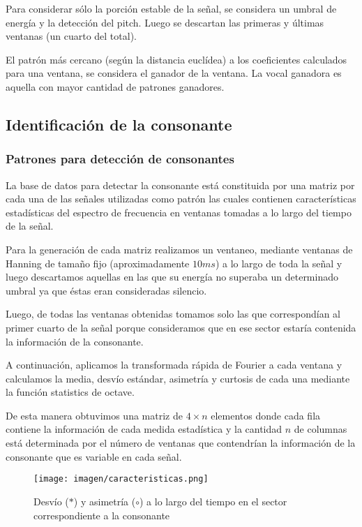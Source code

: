 \documentclass[conference,a4paper,10pt,oneside,final]{tfmpd}
\begin{document}
		Para considerar sólo la porción estable de la señal,
		se considera un umbral de energía y la detección del pitch.
		Luego se descartan las primeras y últimas ventanas (un cuarto del total).


		El patrón más cercano (según la distancia euclídea) a los coeficientes
		calculados para una ventana, se considera el ganador de la ventana.
		La vocal ganadora es aquella con mayor cantidad de patrones ganadores.

	\subsection{Identificación de la consonante}
	\subsubsection{Patrones para detección de consonantes}

		La base de datos para detectar la consonante está constituida por una
		matriz por cada una de las señales utilizadas como patrón las cuales
		contienen características estadísticas del espectro de frecuencia en
		ventanas tomadas a lo largo del tiempo de la señal.

		Para la  generación de cada matriz realizamos un ventaneo, mediante
		ventanas de Hanning de tamaño fijo (aproximadamente $10 ms$) a lo largo
		de toda la señal y luego descartamos aquellas en las que su energía no
		superaba un determinado umbral ya que éstas eran consideradas silencio.

		Luego, de todas las ventanas obtenidas tomamos solo las que correspondían
		al primer cuarto de la señal porque consideramos que en ese sector
		estaría contenida la información de la consonante.

		A continuación, aplicamos la transformada rápida de Fourier a cada
		ventana y calculamos la media, desvío estándar, asimetría y curtosis
		de cada una mediante la función statistics de octave.

		De esta manera obtuvimos una matriz de $4 \times n$ elementos donde cada fila
		contiene la información de cada medida estadística y la cantidad $n$
		de columnas está determinada por el número de ventanas que contendrían
		la información de la consonante que es variable en cada señal.

		
		\begin{figure}
			\texttt{[image: imagen/caracteristicas.png]}
			\caption{
				Desvío ($*$) y asimetría ($\circ$) a lo largo del tiempo
				en el sector correspondiente a la consonante
			}
			\label{fig:tracto}
		\end{figure}
\end{document}
